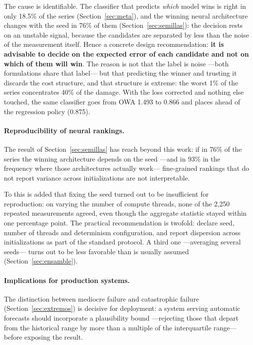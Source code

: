 The cause is identifiable. The classifier that predicts \emph{which} model wins is right
in only 18.5\% of the series (Section~\ref{sec:meta}), and the winning neural architecture
changes with the seed in 76\% of them (Section~\ref{sec:semillas}): the decision rests on
an unstable signal, because the candidates are separated by less than the noise of the
measurement itself. Hence a concrete design recommendation: \textbf{it is advisable to
decide on the expected error of each candidate and not on which of them will win}. The
reason is not that the label is noise ---both formulations share that label--- but that
predicting the winner and trusting it discards the cost structure, and that structure is
extreme: the worst 1\% of the series concentrates 40\% of the damage. With the loss
corrected and nothing else touched, the same classifier goes from OWA 1.493 to 0.866 and
places ahead of the regression policy (0.875).

\paragraph{Reproducibility of neural rankings.} The result of
Section~\ref{sec:semillas} has reach beyond this work: if in 76\% of the series the
winning architecture depends on the seed ---and in 93\% in the frequency where those
architectures actually work--- fine-grained rankings that do not report variance across
initializations are not interpretable.

To this is added that fixing the seed turned out to be insufficient for reproduction: on
varying the number of compute threads, none of the 2{,}250 repeated measurements agreed,
even though the aggregate statistic stayed within one percentage point. The practical
recommendation is twofold: declare seed, number of threads and determinism configuration,
and report dispersion across initializations as part of the standard protocol. A third one
---averaging several seeds--- turns out to be less favorable than is usually assumed
(Section~\ref{sec:ensamble}).

\paragraph{Implications for production systems.} The distinction between mediocre failure
and catastrophic failure (Section~\ref{sec:extremos}) is decisive for deployment: a system
serving automatic forecasts should incorporate a plausibility bound ---rejecting those
that depart from the historical range by more than a multiple of the interquartile
range--- before exposing the result.


